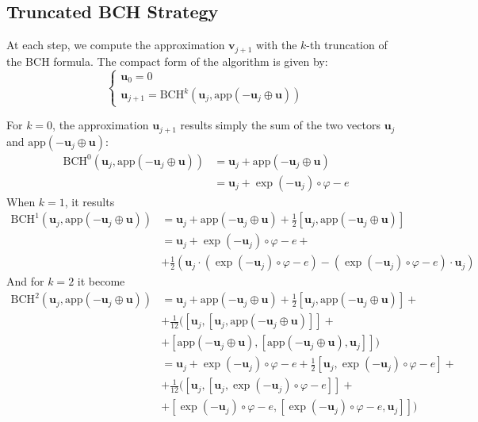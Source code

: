 \subsection{Truncated BCH Strategy}
At each step, we compute the approximation $\mathbf{v}_{j+1}$ with the $k$-th truncation of the BCH formula. The compact form of the algorithm is given by:
\begin{equation}\label{eq:bossa_bch_strat}
\begin{cases}
\mathbf{u}_0 = 0 \\
\mathbf{u}_{j+1} = \text{BCH}^{k}(\mathbf{u}_{j}, \text{app}(-\mathbf{u}_{j}  \oplus  \mathbf{u} ))
\end{cases}
\end{equation}

For $k = 0$, the approximation $\mathbf{u}_{j+1}$ results simply the sum of the two vectors $\mathbf{u}_{j}$ and $ \text{app}(-\mathbf{u}_{j}  \oplus  \mathbf{u} )$:
\begin{align*}
\text{BCH}^{0}(\mathbf{u}_{j}, \text{app}(-\mathbf{u}_{j}  \oplus  \mathbf{u} ))
&=
\mathbf{u}_{j} + \text{app}(-\mathbf{u}_{j}  \oplus  \mathbf{u} )\\
&=
\mathbf{u}_{j} + \exp(-\mathbf{u}_{j})\circ \varphi  - e 
\end{align*}
When $k=1$, it results 
\begin{align*}
\text{BCH}^{1}(\mathbf{u}_{j}, \text{app}(-\mathbf{u}_{j}  \oplus  \mathbf{u} ))
&=
\mathbf{u}_{j} +  \text{app}(-\mathbf{u}_{j}  \oplus  \mathbf{u} ) + \frac{1}{2}[\mathbf{u}_{j},  \text{app}(-\mathbf{u}_{j}  \oplus  \mathbf{u} )]\\
&=
\mathbf{u}_{j} + \exp(-\mathbf{u}_{j})\circ \varphi  - e + \\
&+ \frac{1}{2}(  \mathbf{u}_{j}\cdot( \exp(-\mathbf{u}_{j})\circ \varphi  - e) -  ( \exp(-\mathbf{u}_{j})\circ \varphi - e)\cdot\mathbf{u}_{j})
\end{align*}
And for $k=2$ it become
\begin{align*}
\text{BCH}^{2}(\mathbf{u}_{j}, \text{app}(-\mathbf{u}_{j}  \oplus  \mathbf{u} ))
&=
\mathbf{u}_{j} +  \text{app}(-\mathbf{u}_{j}  \oplus  \mathbf{u} ) 
+ \frac{1}{2}[\mathbf{u}_{j},  \text{app}(-\mathbf{u}_{j}  \oplus  \mathbf{u} )] + \\
&+ \frac{1}{12}\Big([\mathbf{u}_{j},  [\mathbf{u}_{j},  \text{app}(-\mathbf{u}_{j}  \oplus  \mathbf{u} )]] +\\
&+ [\text{app}(-\mathbf{u}_{j}  \oplus  \mathbf{u} ),  [\text{app}(-\mathbf{u}_{j}  \oplus  \mathbf{u} ) ,\mathbf{u}_{j}  ]] \Big)\\
&=
\mathbf{u}_{j} + \exp(-\mathbf{u}_{j})\circ \varphi  - e 
+ \frac{1}{2}[\mathbf{u}_{j},  \exp(-\mathbf{u}_{j})\circ \varphi  - e ] + \\
&+ \frac{1}{12}\Big([\mathbf{u}_{j},  [\mathbf{u}_{j},  \exp(-\mathbf{u}_{j}) \circ\varphi  - e ]]+\\
&+ [\exp(-\mathbf{u}_{j})\circ \varphi  - e ,  [\exp(-\mathbf{u}_{j}) \circ\varphi - e  ,\mathbf{u}_{j}  ]] \Big)\\
\end{align*}

